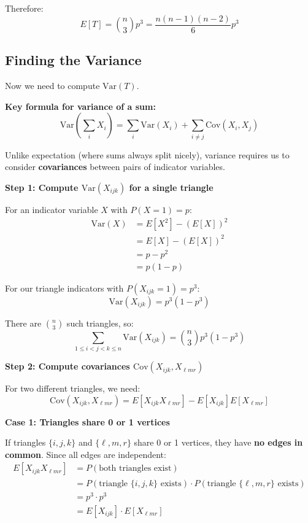 \documentclass[11pt]{article}
\begin{document}
Therefore:
\[
\boxed{E[T] = \binom{n}{3} p^3 = \frac{n(n-1)(n-2)}{6} p^3}
\]

\vspace{1em}

\subsection*{Finding the Variance}

Now we need to compute $\text{Var}(T)$.

\textbf{Key formula for variance of a sum:}
\[
\text{Var}\left(\sum_i X_i\right) = \sum_i \text{Var}(X_i) + \sum_{i \neq j} \text{Cov}(X_i, X_j)
\]

Unlike expectation (where sums always split nicely), variance requires us to consider \textbf{covariances} between pairs of indicator variables.

\vspace{0.5em}

\textbf{Step 1: Compute $\text{Var}(X_{ijk})$ for a single triangle}

For an indicator variable $X$ with $P(X = 1) = p$:
\begin{align*}
\text{Var}(X) &= E[X^2] - (E[X])^2 \\
&= E[X] - (E[X])^2 \tag{since $X^2 = X$ for indicators} \\
&= p - p^2 \\
&= p(1-p)
\end{align*}

For our triangle indicators with $P(X_{ijk} = 1) = p^3$:
\[
\text{Var}(X_{ijk}) = p^3(1 - p^3)
\]

There are $\binom{n}{3}$ such triangles, so:
\[
\sum_{1 \leq i < j < k \leq n} \text{Var}(X_{ijk}) = \binom{n}{3} p^3(1-p^3)
\]

\vspace{0.5em}

\textbf{Step 2: Compute covariances $\text{Cov}(X_{ijk}, X_{\ell m r})$}

For two different triangles, we need:
\[
\text{Cov}(X_{ijk}, X_{\ell m r}) = E[X_{ijk} X_{\ell m r}] - E[X_{ijk}] E[X_{\ell m r}]
\]

\textbf{Case 1: Triangles share 0 or 1 vertices}

If triangles $\{i,j,k\}$ and $\{\ell, m, r\}$ share 0 or 1 vertices, they have \textbf{no edges in common}. Since all edges are independent:
\begin{align*}
E[X_{ijk} X_{\ell m r}] &= P(\text{both triangles exist}) \\
&= P(\text{triangle } \{i,j,k\} \text{ exists}) \cdot P(\text{triangle } \{\ell,m,r\} \text{ exists}) \\
&= p^3 \cdot p^3 \\
&= E[X_{ijk}] \cdot E[X_{\ell m r}]
\end{align*}
\end{document}
